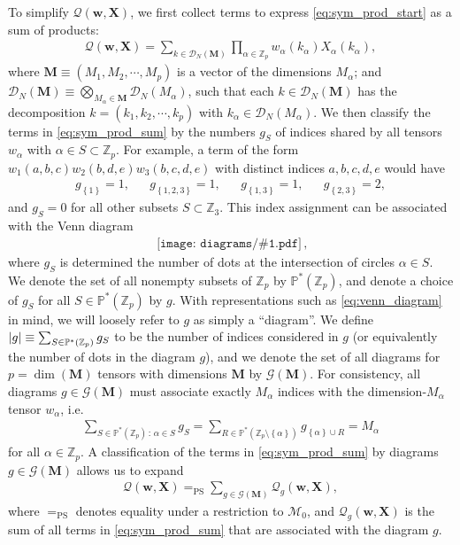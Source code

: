 \documentclass[nofootinbib,notitlepage,11pt]{revtex4-2}
\newcommand{\p}[1]{\left(#1\right)} %
\renewcommand{\set}[1]{\left\{#1\right\}} %
\newcommand{\m}{\bm} %
\newcommand{\1}{\mathds{1}}
\newcommand{\D}{\mathcal{D}}
\newcommand{\G}{\mathcal{G}}
\newcommand{\M}{\mathcal{M}}
\newcommand{\Q}{\mathcal{Q}}
\newcommand{\PP}{\mathbb{P}}
\newcommand{\ZZ}{\mathbb{Z}}
\newcommand{\EQPS}{=_{\text{PS}}}
\newcommand{\diagram}[1]
{\,\texttt{[image: diagrams/\#1.pdf]}\,}
\begin{document}
To simplify $\Q\p{\m w,\m X}$, we first collect terms to express \eqref{eq:sym_prod_start} as a sum of products:
\begin{align}
  \Q\p{\m w,\m X} = \sum_{k\in\D_N\p{\m M}} \prod_{\alpha\in\ZZ_p}
  w_\alpha\p{k_\alpha} X_\alpha\p{k_\alpha},
  \label{eq:sym_prod_sum}
\end{align}
where $\m M\equiv\p{M_1,M_2,\cdots,M_p}$ is a vector of the dimensions $M_\alpha$; and $\D_N\p{\m M}\equiv\bigotimes_{M_\alpha\in\m M}\D_N\p{M_\alpha}$, such that each $k\in\D_N\p{\m M}$ has the decomposition $k=\p{k_1,k_2,\cdots,k_p}$ with $k_\alpha\in\D_N\p{M_\alpha}$.
We then classify the terms in \eqref{eq:sym_prod_sum} by the numbers $g_S$ of indices shared by all tensors $w_\alpha$ with $\alpha\in S\subset\ZZ_p$.
For example, a term of the form $w_1\p{a,b,c} w_2\p{b,d,e} w_3\p{b,c,d,e}$ with distinct indices $a,b,c,d,e$ would have
\begin{align}
  g_{\set{1}} = 1,
  &&
  g_{\set{1,2,3}} = 1,
  &&
  g_{\set{1,3}} = 1,
  &&
  g_{\set{2,3}} = 2,
\end{align}
and $g_S=0$ for all other subsets $S\subset\ZZ_3$.
This index assignment can be associated with the Venn diagram
\begin{align}
  \diagram{example_123},
  \label{eq:venn_diagram}
\end{align}
where $g_S$ is determined the number of dots at the intersection of circles $\alpha\in S$.
We denote the set of all nonempty subsets of $\ZZ_p$ by $\PP^*\p{\ZZ_p}$, and denote a choice of $g_S$ for all $S\in\PP^*\p{\ZZ_p}$ by $g$.
With representations such as \eqref{eq:venn_diagram} in mind, we will loosely refer to $g$ as simply a ``diagram''.
We define $\abs{g}\equiv\sum_{S\in\PP^*\p{\ZZ_p}}g_S$ to be the number of indices considered in $g$ (or equivalently the number of dots in the diagram $g$), and we denote the set of all diagrams for $p=\dim\p{\m M}$ tensors with dimensions $\m M$ by $\G\p{\m M}$.
For consistency, all diagrams $g\in\G\p{\m M}$ must associate exactly $M_\alpha$ indices with the dimension-$M_\alpha$ tensor $w_\alpha$, i.e.
\begin{align}
  \sum_{S\in\PP^*\p{\ZZ_p}\,:\,\alpha\in S} g_S
  = \sum_{R\in\PP^*\p{\ZZ_p\setminus\set{\alpha}}} g_{\set{\alpha}\cup R}
  = M_\alpha
\end{align}
for all $\alpha\in\ZZ_p$.
A classification of the terms in \eqref{eq:sym_prod_sum} by diagrams $g\in\G\p{\m M}$ allows us to expand
\begin{align}
  \Q\p{\m w,\m X} \EQPS \sum_{g\in\G\p{\m M}} \Q_g\p{\m w,\m X},
  \label{eq:sym_prod_diagrams}
\end{align}
where $\EQPS$ denotes equality under a restriction to $\M_0$, and $\Q_g\p{\m w,\m X}$ is the sum of all terms in \eqref{eq:sym_prod_sum} that are associated with the diagram $g$.
\end{document}

